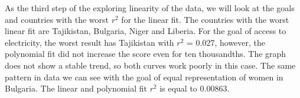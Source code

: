 \documentclass[reprint, onecolumn, amsmath, amssymb, showpacs, superscriptaddress, aps, prl]{revtex4-2}
\begin{document}
As the third step of the exploring linearity of the data, we will look at the goals and countries with the worst \(r^2\) for the linear fit. The countries with the worst linear fit are Tajikistan, Bulgaria, Niger and Liberia. For the goal of access to electricity, the worst result has Tajikistan with \(r^2\) = 0.027, however, the polynomial fit did not increase the score even for ten thousandths. The graph does not show a stable trend, so both curves work poorly in this case.
The same pattern in data we can see with the goal of equal representation of women in Bulgaria. The linear and polynomial fit \(r^2\) is equal to 0.00863.
\begin{figure}[h!]%
    \centering
    \qquad
\end{figure}
\end{document}
